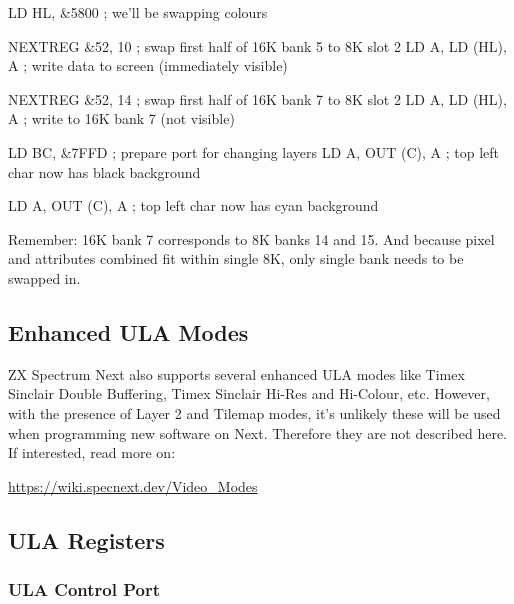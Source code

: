 \begin{tcblisting}{}
	LD HL, &5800        ; we'll be swapping colours

	NEXTREG &52, 10     ; swap first half of 16K bank 5 to 8K slot 2
	LD A, %
	LD (HL), A          ; write data to screen (immediately visible)
	
	NEXTREG &52, 14     ; swap first half of 16K bank 7 to 8K slot 2
	LD A, %
	LD (HL), A          ; write to 16K bank 7 (not visible)
	
	LD BC, &7FFD        ; prepare port for changing layers
	LD A, %
	OUT (C), A          ; top left char now has black background
	
	LD A, %
	OUT (C), A          ; top left char now has cyan background
\end{tcblisting}

Remember: 16K bank 7 corresponds to 8K banks 14 and 15. And because pixel and attributes combined fit within single 8K, only single bank needs to be swapped in.

\subsection{Enhanced ULA Modes}

ZX Spectrum Next also supports several enhanced ULA modes like Timex Sinclair Double Buffering, Timex Sinclair Hi-Res and Hi-Colour, etc. However, with the presence of Layer 2 and Tilemap modes, it's unlikely these will be used when programming new software on Next. Therefore they are not described here. If interested, read more on:

\url{https://wiki.specnext.dev/Video_Modes}


\subsection{ULA Registers}
\label{zx_next_ula_registers}

\subsubsection{ULA Control Port }

\begin{NextPort}
\end{NextPort}


